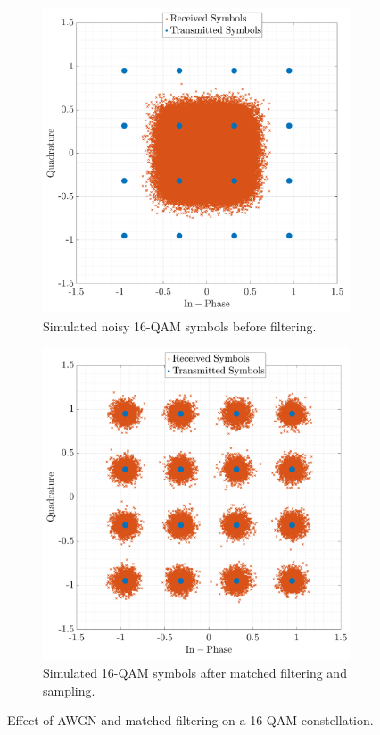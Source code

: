 \begin{figure}[H]
    \centering
    \begin{subfigure}{0.48\textwidth}
        \includegraphics[width=\linewidth]{Images/const-noisy.png}
        \caption{Simulated noisy 16-QAM symbols before filtering.}
        \label{fig:const-noisy_cont}
    \end{subfigure}\hfill
    \begin{subfigure}{0.48\textwidth}
        \includegraphics[width=\linewidth]{Images/const-filtered-down.png} 
        \caption{Simulated 16-QAM symbols after matched filtering and sampling.}
        \label{fig:const-filtered-down_cont}
    \end{subfigure}
    \caption{Effect of AWGN and matched filtering on a 16-QAM constellation.}
    \label{fig:constellations-noise_cont}
\end{figure}


